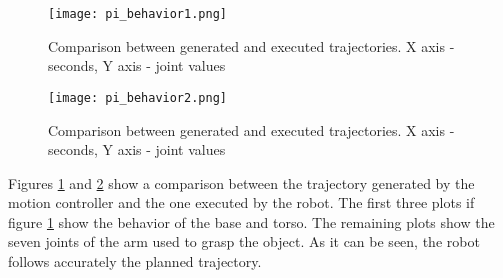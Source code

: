 \begin{figure}[H]
	\centering
	\texttt{[image: pi\_behavior1.png]}
	\vspace{-10pt}
	\caption[Comparison: Generated and Executed trajectory]{Comparison between generated and executed trajectories. X axis - seconds, Y axis - joint values}
	\vspace{-15pt}
	\label{fig:behavior}
\end{figure}
\begin{figure}[H]
	\centering
	\texttt{[image: pi\_behavior2.png]}
	\vspace{-10pt}
	\caption[Comparison: Generated and Executed trajectory]{Comparison between generated and executed trajectories. X axis - seconds, Y axis - joint values}
	\vspace{-15pt}
	\label{fig:behavior2}
\end{figure}

Figures \ref{fig:behavior} and \ref{fig:behavior2} show a comparison between the trajectory generated by the motion controller and the one executed by the robot. The first three plots if figure \ref{fig:behavior} show the behavior of the base and torso. The remaining plots show the seven joints of the arm used to grasp the object. As it can be seen, the robot follows accurately the planned trajectory.
